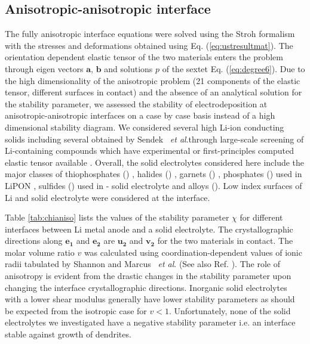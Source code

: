 \documentclass[%
reprint,
 amsmath,amssymb,
 aps,
 prb,
]{revtex4-1}
\def\etal{\emph{et al}.}
\newcommand*{\rtvec}[1]{\mathbf{#1}}
\begin{document}
\subsection{Anisotropic-anisotropic interface}
The fully anisotropic interface equations were solved using the Stroh formalism with the stresses and deformations obtained using Eq. (\ref{eq:ustresultmat}). The orientation dependent elastic tensor of the two materials enters the problem through eigen vectors $\rtvec{a}$, $\rtvec{b}$ and solutions $p$ of the sextet Eq. (\ref{eq:degree6}). Due to the high dimensionality of the anisotropic problem (21 components of the elastic tensor, different surfaces in contact) and the absence of an analytical solution for the stability parameter, we assessed the stability of electrodeposition at anisotropic-anisotropic interfaces on a case by case basis instead of a high dimensional stability diagram. We considered several high Li-ion conducting solids including several obtained by Sendek ~\etal through large-scale screening of Li-containing compounds  \cite{sendek2017holistic} which have experimental \cite{crcelastic} or first-principles computed elastic tensor available \cite{Ahmad16uncertainty,Jain2013, de2015charting}. Overall, the solid electrolytes considered here include the major classes of thiophosphates () \cite{Kamaya2011}, halides () \cite{poulsen1981-halide}, garnets () \cite{weppner2003-garnet}, phosphates () used in LiPON \cite{Yu1997-lipon, dudney2005-lipon}, sulfides () used in - solid electrolyte \cite{tatsumisago2013-sulfide} and alloys (). Low index surfaces of Li and solid electrolyte were considered at the interface.

Table \ref{tab:chianiso} lists the values of the stability parameter $\chi$ for different interfaces between Li metal anode and a solid electrolyte. The crystallographic directions along $\rtvec{e_1}$ and $\rtvec{e_2}$ are $\rtvec{u_2}$ and $\rtvec{v_2}$ for the two materials in contact. The molar volume ratio $v$ was calculated using coordination-dependent values of ionic radii tabulated  by Shannon \cite{shannon1976revised} and Marcus ~\etal \cite{marcus-ionvolumes} (See also Ref. ). The role of anisotropy is evident from the drastic changes in the stability parameter upon changing the interface crystallographic directions. Inorganic solid electrolytes with a lower shear modulus generally have lower stability parameters as should be expected from the isotropic case for $v<1$. Unfortunately, none of the solid electrolytes we investigated have a negative stability parameter i.e. an interface stable against growth of dendrites.
\end{document}
